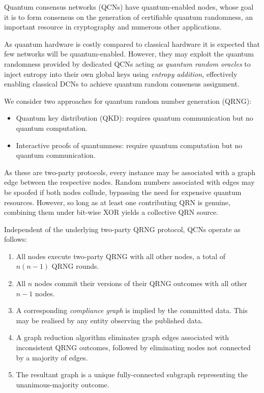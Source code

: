 Quantum consensus networks (QCNs) have quantum-enabled nodes, whose goal it is to form consensus on the generation of certifiable quantum randomness, an important resource in cryptography and numerous other applications.

As quantum hardware is costly compared to classical hardware it is expected that few networks will be quantum-enabled. However, they may exploit the quantum randomness provided by dedicated QCNs acting as \emph{quantum random oracles} to inject entropy into their own global keys using \emph{entropy addition}, effectively enabling classical DCNs to achieve quantum random consensus assignment.

We consider two approaches for quantum random number generation (QRNG):
\begin{itemize}
	\item Quantum key distribution (QKD): requires quantum communication but no quantum computation.
	\item Interactive proofs of quantumness: require quantum computation but no quantum communication.
\end{itemize}

As these are two-party protocols, every instance may be associated with a graph edge between the respective nodes. Random numbers associated with edges may be spoofed if both nodes collude, bypassing the need for expensive quantum resources. However, so long as at least one contributing QRN is genuine, combining them under bit-wise XOR yields a collective QRN source.

Independent of the underlying two-party QRNG protocol, QCNs operate as follows:
\begin{enumerate}
	\item All nodes execute two-party QRNG with all other nodes, a total of $n(n-1)$ QRNG rounds.
	\item All $n$ nodes commit their versions of their QRNG outcomes with all other $n-1$ nodes.
	\item A corresponding \emph{compliance graph} is implied by the committed data. This may be realised by any entity observing the published data.
	\item A graph reduction algorithm eliminates  graph edges associated with inconsistent QRNG outcomes, followed by eliminating nodes not connected by a majority of edges.
	\item The resultant graph is a unique fully-connected subgraph representing the unanimous-majority outcome.
\end{enumerate}

